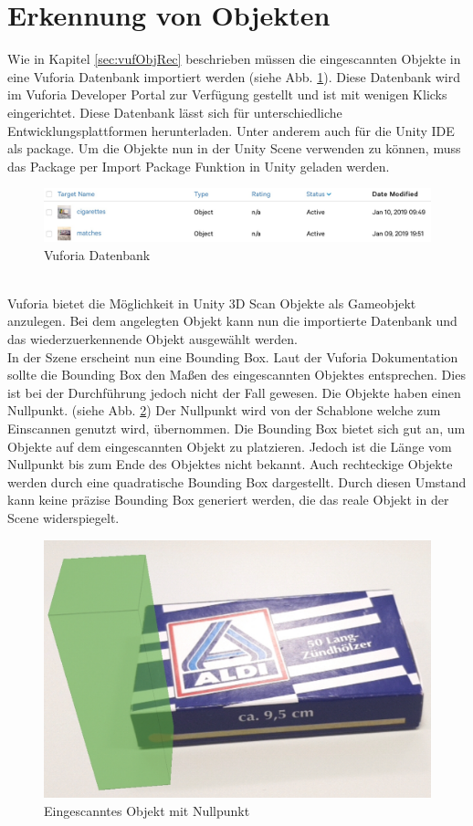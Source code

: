 \section{Erkennung von Objekten}
\label{sec:vufObjRecImpl}
Wie in Kapitel \ref{sec:vufObjRec} beschrieben müssen die eingescannten Objekte in eine Vuforia Datenbank importiert werden (siehe Abb. \ref{fig:vuforiaObjectDatabase}). Diese Datenbank wird im Vuforia Developer Portal zur Verfügung gestellt und ist mit wenigen Klicks eingerichtet. Diese Datenbank lässt sich für unterschiedliche Entwicklungsplattformen herunterladen. Unter anderem auch für die Unity IDE als package. Um die Objekte nun in der Unity Scene verwenden zu können, muss das Package per Import Package Funktion in Unity geladen werden.
\begin{figure}[h]
    \centering
    \includegraphics[width=\textwidth]{assets/vuforiaDataBase.jpeg}
    \caption{Vuforia Datenbank}\label{fig:vuforiaObjectDatabase}
\end{figure}\\
Vuforia bietet die Möglichkeit in Unity 3D Scan Objekte als Gameobjekt anzulegen. Bei dem angelegten Objekt kann nun die importierte Datenbank und das wiederzuerkennende Objekt ausgewählt werden. \\
In der Szene erscheint nun eine Bounding Box. Laut der Vuforia Dokumentation\cite{VufObjRec}  sollte die Bounding Box den Maßen des eingescannten Objektes entsprechen. Dies ist bei der Durchführung jedoch nicht der Fall gewesen. Die Objekte haben einen Nullpunkt. (siehe Abb. \ref{fig:matches}) Der Nullpunkt wird von der Schablone welche zum Einscannen genutzt wird, übernommen. Die Bounding Box bietet sich gut an, um Objekte auf dem eingescannten Objekt zu platzieren. Jedoch ist die Länge vom Nullpunkt bis zum Ende des Objektes nicht bekannt. Auch rechteckige Objekte werden durch eine quadratische Bounding Box dargestellt. Durch diesen Umstand kann keine präzise Bounding Box generiert werden, die das reale Objekt in der Scene widerspiegelt.\\
\begin{figure}[h]
    \centering
    \includegraphics[width=0.5\linewidth]{assets/matches.png}
    \caption{Eingescanntes Objekt mit Nullpunkt}\label{fig:matches}
\end{figure}\\
